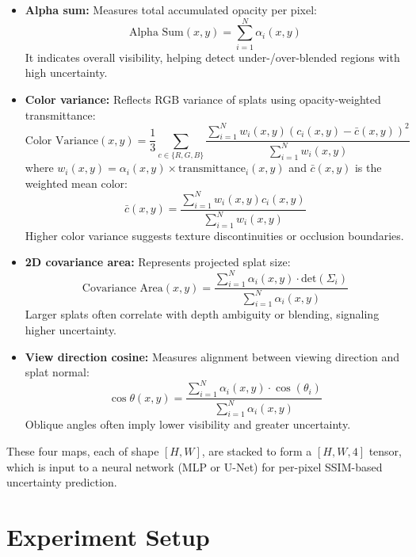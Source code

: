 \documentclass[10pt,letterpaper]{article}
\begin{document}
\begin{itemize}
	\item \textbf{Alpha sum:} Measures total accumulated opacity per pixel:
	\begin{equation}
		\text{Alpha Sum}(x, y) = \sum_{i=1}^{N} \alpha_i(x, y)
	\end{equation}
	It indicates overall visibility, helping detect under-/over-blended regions with high uncertainty.
	
	\item \textbf{Color variance:} Reflects RGB variance of splats using opacity-weighted transmittance:
	\begin{equation}
		\text{Color Variance}(x, y) = \frac{1}{3} \sum_{c \in \{R,G,B\}} \frac{\sum_{i=1}^{N} w_i(x,y) (c_i(x,y) - \bar{c}(x,y))^2}{\sum_{i=1}^{N} w_i(x,y)}
	\end{equation}
	where $w_i(x,y) = \alpha_i(x,y) \times \text{transmittance}_i(x,y)$ and $\bar{c}(x,y)$ is the weighted mean color:
	\begin{equation}
		\bar{c}(x, y) = \frac{\sum_{i=1}^{N} w_i(x,y) c_i(x,y)}{\sum_{i=1}^{N} w_i(x,y)}
	\end{equation}
	Higher color variance suggests texture discontinuities or occlusion boundaries.
	
	\item \textbf{2D covariance area:} Represents projected splat size:
	\begin{equation}
		\text{Covariance Area}(x, y) = \frac{\sum_{i=1}^{N} \alpha_i(x, y) \cdot \text{det}(\Sigma_i)}{\sum_{i=1}^{N} \alpha_i(x, y)}
	\end{equation}
	Larger splats often correlate with depth ambiguity or blending, signaling higher uncertainty.
	
	\item \textbf{View direction cosine:} Measures alignment between viewing direction and splat normal:
	\begin{equation}
		\cos\theta(x, y) = \frac{\sum_{i=1}^{N} \alpha_i(x, y) \cdot \cos(\theta_i)}{\sum_{i=1}^{N} \alpha_i(x, y)}
	\end{equation}
	Oblique angles often imply lower visibility and greater uncertainty.
\end{itemize}

These four maps, each of shape $[H, W]$, are stacked to form a $[H, W, 4]$ tensor, which is input to a neural network (MLP or U-Net) for per-pixel SSIM-based uncertainty prediction.

\section{Experiment Setup}
\end{document}
